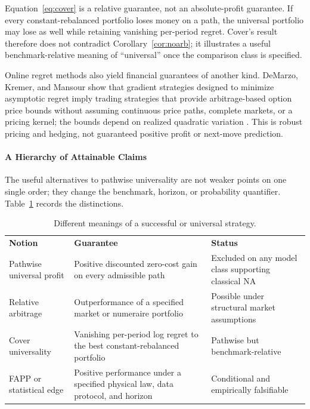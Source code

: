 \documentclass[aps,pra,reprint,superscriptaddress,amsmath,amssymb,floatfix]{revtex4-2}
\theoremstyle{plain}
\theoremstyle{definition}
\theoremstyle{remark}
\begin{document}
Equation~\eqref{eq:cover} is a relative guarantee, not an absolute-profit
guarantee. If every constant-rebalanced portfolio loses money on a path, the
universal portfolio may lose as well while retaining vanishing per-period
regret. Cover's result therefore does not contradict
Corollary~\ref{cor:noarb}; it illustrates a useful benchmark-relative meaning
of ``universal'' once the comparison class is specified.

Online regret methods also yield financial guarantees of another kind.
DeMarzo, Kremer, and Mansour show that gradient strategies designed to
minimize asymptotic regret imply trading strategies that provide
arbitrage-based option price bounds without assuming continuous price paths,
complete markets, or a pricing kernel; the bounds depend on realized quadratic
variation
\cite{DeMarzoKremerMansour2016}. This is robust pricing and hedging, not
guaranteed positive profit or next-move prediction.

\paragraph{A Hierarchy of Attainable Claims}

The useful alternatives to pathwise universality are not weaker points on one
single order; they change the benchmark, horizon, or probability quantifier.
Table~\ref{tab:hierarchy} records the distinctions.

\begin{table}[ht]
\caption{\label{tab:hierarchy}Different meanings of a successful or universal strategy.}
\centering
\begin{ruledtabular}
\begin{tabular}{p{}p{}p{}}
\textbf{Notion} & \textbf{Guarantee} & \textbf{Status} \\
\colrule
Pathwise universal profit
& Positive discounted zero-cost gain on every admissible path
& Excluded on any model class supporting classical NA \\
Relative arbitrage
& Outperformance of a specified market or numeraire portfolio
& Possible under structural market assumptions \\
Cover universality
& Vanishing per-period log regret to the best constant-rebalanced portfolio
& Pathwise but benchmark-relative \\
FAPP or statistical edge
& Positive performance under a specified physical law, data protocol, and horizon
& Conditional and empirically falsifiable \\
\end{tabular}
\end{ruledtabular}
\end{table}
\end{document}
